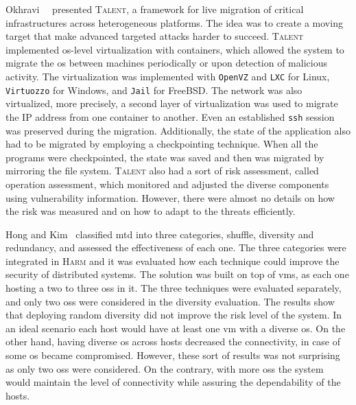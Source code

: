 Okhravi~\etal{}~\cite{Okhravi:2014} presented \textsc{Talent}, a framework for live migration of critical infrastructures across heterogeneous platforms.
The idea was to create a moving target that make advanced targeted attacks harder to succeed. 
\textsc{Talent} implemented \gls{os}-level virtualization with containers, which allowed the system to migrate the \gls{os} between machines periodically or upon detection of malicious activity. 
The virtualization was implemented with \texttt{OpenVZ} and \texttt{LXC} for Linux, \texttt{Virtuozzo} for Windows, and \texttt{Jail} for FreeBSD. 
The network was also virtualized, more precisely, a second layer of virtualization was used to migrate the IP address from one container to another. 
Even an established \texttt{ssh} session was preserved during the migration. 
Additionally, the state of the application also had to be migrated by employing a checkpointing technique. 
When all the programs were checkpointed, the state was saved and then was migrated by mirroring the file system. 
\textsc{Talent} also had a sort of risk assessment, called operation assessment, which monitored and adjusted the diverse components using vulnerability information. 
However, there were almost no details on how the risk was measured and on how to adapt to the threats efficiently.


Hong and Kim~\cite{Hong:2015} classified \gls{mtd} into three categories, shuffle, diversity and redundancy, and assessed the effectiveness of each one.
The three categories were integrated in \textsc{Harm} and it was evaluated how each technique could improve the security of distributed systems.
The solution was built on top of \glspl{vm}, as each one hosting a two to three \glspl{os} in it.
The three techniques were evaluated separately, and only two \glspl{os} were considered in the diversity evaluation.
The results show that deploying random diversity did not improve the risk level of the system. 
In an ideal scenario each host would have at least one \gls{vm} with a diverse \gls{os}.
On the other hand, having diverse \gls{os} across hosts decreased the connectivity, in case of some \gls{os} became compromised.
However, these sort of results was not surprising as only two \glspl{os} were considered.
On the contrary, with more \glspl{os} the system would maintain the level of connectivity while assuring the dependability of the hosts.
 

